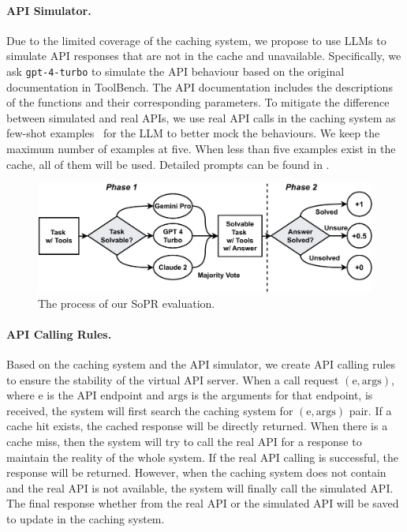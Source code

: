 \paragraph{API Simulator.}
Due to the limited coverage of the caching system, we propose to use LLMs to simulate API responses that are not in the cache and unavailable. 
Specifically, we ask \texttt{gpt-4-turbo} to simulate the API behaviour based on the original documentation in ToolBench.
The API documentation includes the descriptions of the functions and their corresponding parameters. 
To mitigate the difference between simulated and real APIs, we use real API calls in the caching system as few-shot examples~\citep{brown2020language} for the LLM to better mock the behaviours. 
We keep the maximum number of examples at five.
When less than five examples exist in the cache, all of them will be used.
Detailed prompts can be found in .
\begin{figure}[t!]
    \centering
    \includegraphics[width=\linewidth]{figs/SoPR.pdf}
    \caption{The process of our SoPR evaluation.}
    \label{fig:SoPR}
\end{figure}


\paragraph{API Calling Rules.}
Based on the caching system and the API simulator, we create API calling rules to ensure the stability of the virtual API server.
When a call request $(\mathrm{e},\mathrm{args})$, where $\mathrm{e}$ is the API endpoint and $\mathrm{args}$ is the arguments for that endpoint, is received, the system will first search the caching system for $(\mathrm{e},\mathrm{args})$ pair.
If a cache hit exists, the cached response will be directly returned.
When there is a cache miss, then the system will try to call the real API for a response to maintain the reality of the whole system.
If the real API calling is successful, the response will be returned.
However, when the caching system does not contain and the real API is not available, the system will finally call the simulated API. 
The final response whether from the real API or the simulated API will be saved to update in the caching system.

